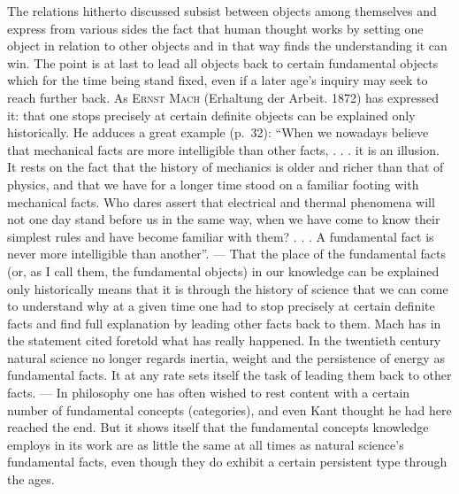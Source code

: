 \documentclass[12pt]{article}
\newcommand{\opage}[1]{\marginnote{\footnotesize\textit{[#1]}}}
\begin{document}
\noindent \opage{58}The relations hitherto discussed subsist between objects among
themselves and express from various sides the fact that human thought works
by setting one object in relation to other objects and in that way finds the
understanding it can win. The point is at last to lead all objects back to
certain fundamental objects which for the time being stand fixed, even if a
later age's inquiry may seek to reach further back. As \textsc{Ernst Mach}
(Erhaltung der Arbeit. 1872) has expressed it: that one stops precisely at
certain definite objects can be explained only historically. He adduces a
great example (p.~32): ``When we nowadays believe that mechanical facts are
more intelligible than other facts, . . . it is an illusion. It rests on the
fact that the history of mechanics is older and richer than that of physics,
and that we have for a longer time stood on a familiar footing with
mechanical facts. Who dares assert that electrical and thermal phenomena
will not one day stand before us in the same way, when we have come to know
their simplest rules and have become familiar with them? . . . A fundamental
fact is never more intelligible than another''. --- That the place of the
fundamental facts (or, as I call them, the fundamental objects) in our
knowledge can be explained only historically means that it is through the
history of science that we can come to understand why at a given time one
had to stop precisely at certain definite facts and find full explanation by
leading other facts back to them. Mach has in the statement cited foretold
what has really happened. In the twentieth century natural science no longer
regards inertia, weight and the persistence of energy as fundamental facts.
It at any rate sets itself the task of leading them back \opage{59}to other facts. ---
In philosophy one has often wished to rest content with a certain number of
fundamental concepts (categories), and even Kant thought he had here reached
the end. But it shows itself that the fundamental concepts knowledge employs
in its work are as little the same at all times as natural science's
fundamental facts, even though they do exhibit a certain persistent type
through the ages.
\end{document}
